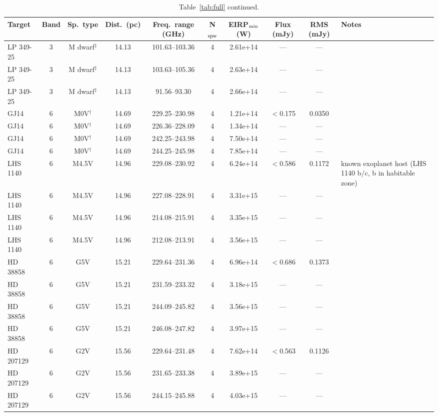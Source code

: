 \documentclass{openjournal}
\begin{document}
\begin{table}
\centering
\scriptsize
\caption{Table~\ref{tab:full} continued.}
\label{tab:full6}
\begin{tabularx}{\textwidth}{@{}l c c c c c c c c X@{}}
\hline
Target & Band & Sp.\ type & Dist.\ (pc) & Freq.\ range (GHz) & N$_{\rm spw}$ & EIRP$_{\rm min}$ (W) & Flux (mJy) & RMS (mJy) & Notes \\
\hline
LP  349-25 & 3 & M dwarf$^\ddagger$ & 14.13 & 101.63--103.36 & 4 & 2.61e+14 & --- & --- &  \\
LP  349-25 & 3 & M dwarf$^\ddagger$ & 14.13 & 103.63--105.36 & 4 & 2.63e+14 & --- & --- &  \\
LP  349-25 & 3 & M dwarf$^\ddagger$ & 14.13 & 91.56--93.30 & 4 & 2.66e+14 & --- & --- &  \\
GJ14 & 6 & M0V$^\dagger$ & 14.69 & 229.25--230.98 & 4 & 1.21e+14 & $<$0.175 & 0.0350 &  \\
GJ14 & 6 & M0V$^\dagger$ & 14.69 & 226.36--228.09 & 4 & 1.34e+14 & --- & --- &  \\
GJ14 & 6 & M0V$^\dagger$ & 14.69 & 242.25--243.98 & 4 & 7.50e+14 & --- & --- &  \\
GJ14 & 6 & M0V$^\dagger$ & 14.69 & 244.25--245.98 & 4 & 7.85e+14 & --- & --- &  \\
LHS 1140 & 6 & M4.5V & 14.96 & 229.08--230.92 & 4 & 6.24e+14 & $<$0.586 & 0.1172 & known exoplanet host (LHS 1140 b/c, b in habitable zone) \\
LHS 1140 & 6 & M4.5V & 14.96 & 227.08--228.91 & 4 & 3.31e+15 & --- & --- &  \\
LHS 1140 & 6 & M4.5V & 14.96 & 214.08--215.91 & 4 & 3.35e+15 & --- & --- &  \\
LHS 1140 & 6 & M4.5V & 14.96 & 212.08--213.91 & 4 & 3.56e+15 & --- & --- &  \\
HD 38858 & 6 & G5V & 15.21 & 229.64--231.36 & 4 & 6.96e+14 & $<$0.686 & 0.1373 &  \\
HD 38858 & 6 & G5V & 15.21 & 231.59--233.32 & 4 & 3.18e+15 & --- & --- &  \\
HD 38858 & 6 & G5V & 15.21 & 244.09--245.82 & 4 & 3.56e+15 & --- & --- &  \\
HD 38858 & 6 & G5V & 15.21 & 246.08--247.82 & 4 & 3.97e+15 & --- & --- &  \\
HD 207129 & 6 & G2V & 15.56 & 229.64--231.48 & 4 & 7.62e+14 & $<$0.563 & 0.1126 &  \\
HD 207129 & 6 & G2V & 15.56 & 231.65--233.38 & 4 & 3.89e+15 & --- & --- &  \\
HD 207129 & 6 & G2V & 15.56 & 244.15--245.88 & 4 & 4.03e+15 & --- & --- &  \\

\end{tabularx}
\end{table}
\end{document}
